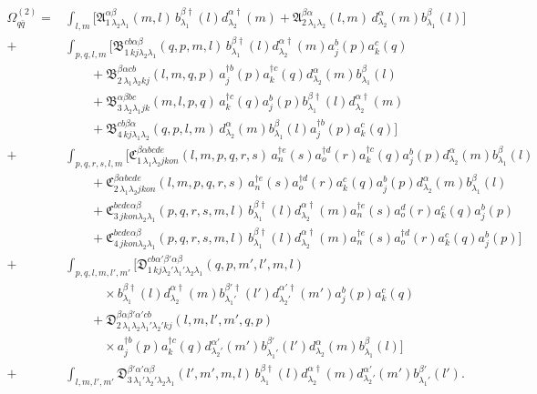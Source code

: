 \documentclass[11pt,a4paper]{article}
\numberwithin{equation}{section}
\newcommand{\mf}[1]{\mathfrak{#1}}
\newcommand{\dg}{\dagger}
\newcommand{\OM}{\Omega}
\begin{document}
{\small
\begin{align}
\OM^{(2)}_{q\bar q}=&\int_{l,m}\Big[\mf A^{\alpha\beta}_{1\,\lambda_{2}\lambda_{1}}(m,l)\,
b^{\beta\dg}_{\lambda_{1}}(l)d^{\alpha\dg}_{\lambda_{2}}(m)
+\mf A^{\beta\alpha}_{2\,\lambda_{1}\lambda_{2}}(l,m)\,d^{\alpha}_{\lambda_{2}}(m)b^{\beta}_{\lambda_{1}}(l)\Big]
\nonumber\\
+&\int_{p,q,l,m}\Big[\mf B^{cb\alpha\beta}_{1\,kj\lambda_{2}\lambda_{1}}(q,p,m,l)\,
b^{\beta\dg}_{\lambda_{1}}(l)d^{\alpha\dg}_{\lambda_{2}}(m)a^{b}_{j}(p)a^{c}_{k}(q)
\nonumber\\
&\qquad+\mf B^{\beta\alpha cb}_{2\,\lambda_{1}\lambda_{2}kj}(l,m,q,p)\,
a^{\dg b}_{j}(p)a^{\dg c}_{k}(q)d^{\alpha}_{\lambda_{2}}(m)b^{\beta}_{\lambda_{1}}(l)
\nonumber\\
&\qquad+\mf B^{\alpha\beta bc}_{3\,\lambda_{2}\lambda_{1}jk}(m,l,p,q)\,
a^{\dg c}_{k}(q)a^{b}_{j}(p)b^{\beta\dg}_{\lambda_{1}}(l)d^{\alpha\dg}_{\lambda_{2}}(m)
\nonumber\\
&\qquad+\mf B^{cb\beta\alpha}_{4\,kj\lambda_{1}\lambda_{2}}(q,p,l,m)\,
d^{\alpha}_{\lambda_{2}}(m)b^{\beta}_{\lambda_{1}}(l)a^{\dg b}_{j}(p)a^{c}_{k}(q)\Big]
\nonumber\\
+&\int_{p,q,r,s,l,m}\Big[
\mf C^{\beta\alpha bcde}_{1\,\lambda_{1}\lambda_{2}jkon}(l,m,p,q,r,s)\,
a^{\dg e}_{n}(s)a^{\dg d}_{o}(r)a^{\dg c}_{k}(q)a^{b}_{j}(p)d^{\alpha}_{\lambda_{2}}(m)b^{\beta}_{\lambda_{1}}(l)
\nonumber\\
&\qquad+\mf C^{\beta\alpha bcde}_{2\,\lambda_{1}\lambda_{2}jkon}(l,m,p,q,r,s)\,
a^{\dg e}_{n}(s)a^{\dg d}_{o}(r)a^{c}_{k}(q)a^{b}_{j}(p)d^{\alpha}_{\lambda_{2}}(m)b^{\beta}_{\lambda_{1}}(l)
\nonumber\\
&\qquad+\mf C^{bcde\alpha\beta}_{3\,jkon\lambda_{2}\lambda_{1}}(p,q,r,s,m,l)\,
b^{\beta\dg}_{\lambda_{1}}(l)d^{\alpha\dg}_{\lambda_{2}}(m)a^{\dg e}_{n}(s)a^{d}_{o}(r)a^{c}_{k}(q)a^{b}_{j}(p)
\nonumber\\
&\qquad+\mf C^{bcde\alpha\beta}_{4\,jkon\lambda_{2}\lambda_{1}}(p,q,r,s,m,l)\,
b^{\beta\dg}_{\lambda_{1}}(l)d^{\alpha\dg}_{\lambda_{2}}(m)a^{\dg e}_{n}(s)a^{\dg d}_{o}(r)a^{c}_{k}(q)a^{b}_{j}(p)\Big]
\nonumber\\
+&\int_{p,q,l,m,l',m'}\Big[
\mf D^{cb\alpha'\beta'\alpha\beta}_{1\,kj\lambda_{2}'\lambda_{1}'\lambda_{2}\lambda_{1}}(q,p,m',l',m,l)
\nonumber\\
&\qquad\quad\times b^{\beta\dg}_{\lambda_{1}}(l)d^{\alpha\dg}_{\lambda_{2}}(m)b^{\beta'\dg}_{\lambda_{1}'}(l')d^{\alpha'\dg}_{\lambda_{2}'}(m')a^{b}_{j}(p)a^{c}_{k}(q)
\nonumber\\
&\qquad+\mf D^{\beta\alpha\beta'\alpha'cb}_{2\,\lambda_{1}\lambda_{2}\lambda_{1}'\lambda_{2}'kj}(l,m,l',m',q,p)
\nonumber\\
&\qquad\quad\times a^{\dg b}_{j}(p)a^{\dg c}_{k}(q)d^{\alpha'}_{\lambda_{2}'}(m')b^{\beta'}_{\lambda_{1}'}(l')d^{\alpha}_{\lambda_{2}}(m)b^{\beta}_{\lambda_{1}}(l)\Big]
\nonumber\\
+&\int_{l,m,l',m'}
\mf D^{\beta'\alpha'\alpha\beta}_{3\,\lambda_{1}'\lambda_{2}'\lambda_{2}\lambda_{1}}(l',m',m,l)\,
b^{\beta\dg}_{\lambda_{1}}(l)d^{\alpha\dg}_{\lambda_{2}}(m)d^{\alpha'}_{\lambda_{2}'}(m')b^{\beta'}_{\lambda_{1}'}(l') .
\label{eq:Om2qq}
\end{align}}
\end{document}
